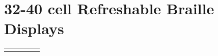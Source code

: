 \documentclass[14pt,letterpaper,twoside]{extreport}
\begin{document}
\pagebreak \hypertarget{cell-refreshable-braille-displays}{%
	\section{32-40 cell Refreshable Braille
	  Displays}\label{cell-refreshable-braille-displays}}

\begin{longtable}[]{@{}
	>{\raggedright\arraybackslash}m{}
	>{\raggedright\arraybackslash}m{}
	>{\raggedright\arraybackslash}m{}
	>{\raggedright\arraybackslash}m{}
	>{\raggedright\arraybackslash}m{}@{}
	}
	\toprule\noalign{}


\end{longtable}
\end{document}
